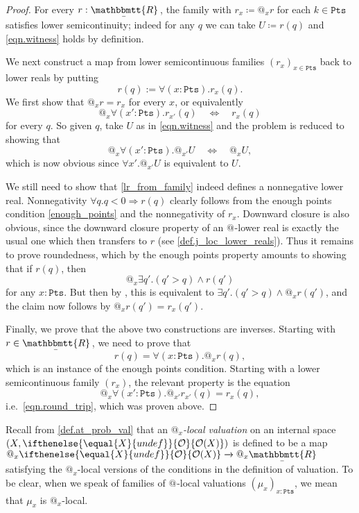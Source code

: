 \documentclass[reqno,11pt]{amsproc}
\makeatletter
\theoremstyle{plain}
\theoremstyle{definition}
\renewcommand{\to}[1][]{\xrightarrow{#1}}
\newcommand{\ubar}[1]{\underaccent{\bar}{#1}}
\newcommand{\internal}[1]{\raisebox{-.03ex}{$\mathbbmtt{#1}$}}
\newcommand{\hs}{\hspace{1pt}}
\newcommand{\trr}{\internal{R}}
\newcommand{\tlrr}{\ubar{\trr}\hs}
\newcommand{\pt}{x}
\newcommand{\Op}[1][undef]{\ifthenelse{\equal{#1}{undef}}{\mathcal{O}}{\mathcal{O}(#1)}}
\newcommand{\pts}{\mathtt{Pts}}		%
\newcommand{\atsymbol}{{@}}
\newcommand{\at}[1][\pt]{\atsymbol_{#1}}
\newcommand{\imp}{\Rightarrow}
\numberwithin{equation}{section}
\makeatother
\begin{document}
\begin{proof}
	For every $r : \tlrr$, the family with $r_\pt\coloneqq \at r$ for each $k\in\pts$ satisfies lower semicontinuity; indeed for any $q$ we can take $U\coloneqq r(q)$ and \eqref{eqn.witness} holds by definition.

	We next construct a map from lower semicontinuous families $(r_\pt)_{\pt\in\pts}$ back to lower reals by putting
	\begin{equation}
		\label{lr_from_family}
		r(q) := \forall (\pt : \pts) . r_\pt(q).
	\end{equation}
	We first show that $\at r = r_\pt$ for every $\pt$, or equivalently
	\[
		\at \forall (\pt':\pts) . r_{\pt'}(q) \quad \Longleftrightarrow \quad r_\pt(q)
	\]
	for every $q$. So given $q$, take $U$ as in \eqref{eqn.witness} and the problem is reduced to showing that
	\begin{equation}\label{eqn.round_trip}
		\at \forall (\pt':\pts) . \at[\pt'] U \quad \Longleftrightarrow \quad \at U,
	\end{equation}
	which is now obvious since $\forall \pt' . \at[\pt'] U$ is equivalent to $U$.

	We still need to show that \eqref{lr_from_family} indeed defines a nonnegative lower real. Nonnegativity $\forall q. q<0\imp r(q)$ clearly follows from the enough points condition \cref{enough_points} and the nonnegativity of $r_\pt$. Downward closure is also obvious, since the downward closure property of an $\at[]$-lower real is exactly the usual one which then transfers to $r$ (see \cref{def.j_loc_lower_reals}). Thus it remains to prove roundedness, which by the enough points property amounts to showing that if $r(q)$, then 
	\[
		\at \exists q'. (q' > q) \wedge r(q')
	\]
	for any $\pt : \pts$. But then by , this is equivalent to $\exists q'. (q' > q)\wedge \at r(q')$, and the claim now follows by $\at r(q') = r_\pt(q')$.

	Finally, we prove that the above two constructions are inverses. Starting with $r \in \tlrr$, we need to prove that
	\[
		r(q) = \forall (\pt : \pts) . \at r(q),
	\]
	which is an instance of the enough points condition. Starting with a lower semicontinuous family $(r_\pt)$, the relevant property is the equation
	\[
		\at \forall (\pt' : \pts) . \at[\pt'] r_{\pt'}(q) = r_\pt(q),
	\]
	i.e.\ \eqref{eqn.round_trip}, which was proven above.
\end{proof}

Recall from \cref{def.at_prob_val} that an \emph{$\at$-local valuation} on an internal space $(X,\Op[X])$ is defined to be a map $\at \Op[X] \to \at \tlrr$ satisfying the $\at$-local versions of the conditions in the definition of valuation. To be clear, when we speak of families of $\at[]$-local valuations $(\mu_\pt)_{\pt : \pts}$, we mean that $\mu_\pt$ is $\at[\pt]$-local.
\end{document}
